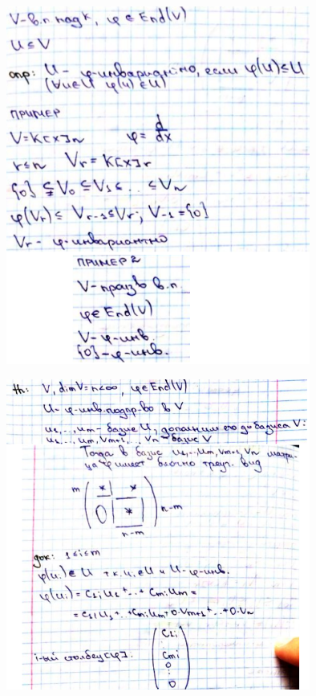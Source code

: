 \documentclass[algebra]{subfiles}
\begin{document}
    \begin{figure}[H]
            \includegraphics[width=10cm]{pics/55_1}
            \centering
    \end{figure}
    \begin{figure}[H]
            \includegraphics[width=10cm]{pics/55_2}
            \centering
    \end{figure}
\end{document}
